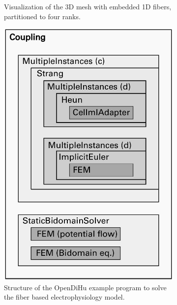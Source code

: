 \begin{figure}
\begin{subfigure}[t]{0.30\textwidth}
    \caption{Visualization of the 3D mesh with embedded 1D fibers, partitioned to four ranks.}%
    \label{fig:mesh_structure}%
  \end{subfigure}
  \qquad
  \begin{subfigure}[t]{0.45\textwidth}%
    \centering%
    \includegraphics[width=\textwidth]{images/implementation/program_structure.pdf}
    \caption{Structure of the OpenDiHu example program to solve the fiber based electrophysiology model.}%
    \label{fig:program_structure}%
  \end{subfigure}
  \\[8mm]
  \begin{subfigure}[t]{0.48\textwidth}%
    \centering%

\end{subfigure}
\end{figure}
